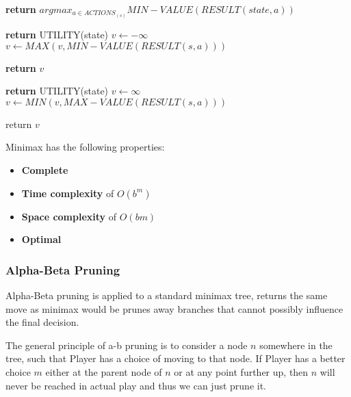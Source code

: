 \documentclass{article}
\begin{document}
\begin{algorithm}
\begin{algorithmic}

    \State \textbf{return} $argmax_{a \in ACTIONS_{(s)}}MIN-VALUE(RESULT(state,a))$
\EndProcedure \newline

        \State \textbf{return} UTILITY(state)
    \EndIf
    \State $v \leftarrow -\infty$
        $v \leftarrow MAX(v,MIN-VALUE(RESULT(s,a)))$
    \EndFor

    \State \textbf{return} $v$ 
\EndProcedure \newline

        \State \textbf{return} UTILITY(state)
        \State $v \leftarrow \infty$
    \EndIf
    \State $v \leftarrow MIN(v,MAX-VALUE(RESULT(s,a)))$
    \EndFor
    
    \State return $v$

\EndProcedure

\end{algorithmic}
\end{algorithm}

Minimax has the following properties:
\begin{itemize}
    \item \textbf{Complete}
    \item \textbf{Time complexity} of $O(b^m)$
    \item \textbf{Space complexity} of $O(bm)$
    \item \textbf{Optimal}
\end{itemize}

\subsubsection{Alpha-Beta Pruning}

Alpha-Beta pruning is applied to a standard minimax tree, returns the same move as minimax would be prunes away branches that cannot possibly influence the final decision.

The general principle of a-b pruning is to consider a node $n$ somewhere in the tree, such that Player has a choice of moving to that node. If Player has a better choice $m$ either at the parent node of $n$ or at any point further up, then $n$ will never be reached in actual play and thus we can just prune it.
\end{document}

